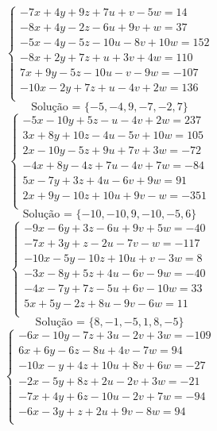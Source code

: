 \documentclass[12pt,oneside,a4paper]{article}
\begin{document}
\vspace{\baselineskip}
\begin{equation*}
\begin{cases}
-7x+4y+9z+7u+v-5w=14 \\
-8x+4y-2z-6u+9v+w=37 \\
-5x-4y-5z-10u-8v+10w=152 \\
-8x+2y+7z+u+3v+4w=110 \\
7x+9y-5z-10u-v-9w=-107 \\
-10x-2y+7z+u-4v+2w=136 \\
\end{cases}
\end{equation*}
\begin{equation*}
\text{Solução = }\{-5,-4,9,-7,-2,7\}
\end{equation*}
\vspace{\baselineskip}
\begin{equation*}
\begin{cases}
-5x-10y+5z-u-4v+2w=237 \\
3x+8y+10z-4u-5v+10w=105 \\
2x-10y-5z+9u+7v+3w=-72 \\
-4x+8y-4z+7u-4v+7w=-84 \\
5x-7y+3z+4u-6v+9w=91 \\
2x+9y-10z+10u+9v-w=-351 \\
\end{cases}
\end{equation*}
\begin{equation*}
\text{Solução = }\{-10,-10,9,-10,-5,6\}
\end{equation*}
\vspace{\baselineskip}
\begin{equation*}
\begin{cases}
-9x-6y+3z-6u+9v+5w=-40 \\
-7x+3y+z-2u-7v-w=-117 \\
-10x-5y-10z+10u+v-3w=8 \\
-3x-8y+5z+4u-6v-9w=-40 \\
-4x-7y+7z-5u+6v-10w=33 \\
5x+5y-2z+8u-9v-6w=11 \\
\end{cases}
\end{equation*}
\begin{equation*}
\text{Solução = }\{8,-1,-5,1,8,-5\}
\end{equation*}
\vspace{\baselineskip}
\begin{equation*}
\begin{cases}
-6x-10y-7z+3u-2v+3w=-109 \\
6x+6y-6z-8u+4v-7w=94 \\
-10x-y+4z+10u+8v+6w=-27 \\
-2x-5y+8z+2u-2v+3w=-21 \\
-7x+4y+6z-10u-2v+7w=-94 \\
-6x-3y+z+2u+9v-8w=94 \\
\end{cases}
\end{equation*}
\end{document}
